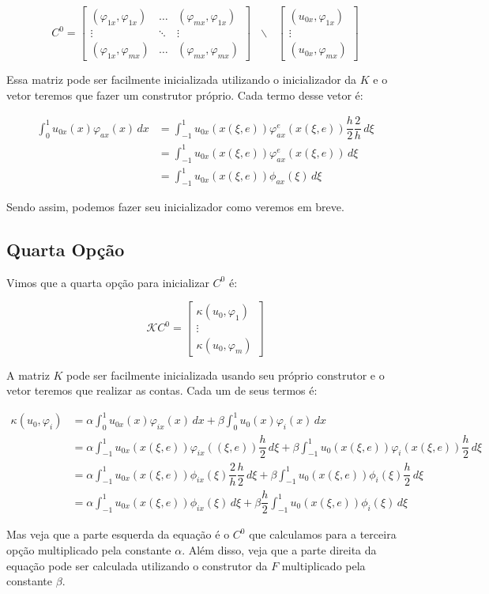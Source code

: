   \[C^0 = \begin{bmatrix}
            (\varphi_{1x}, \varphi_{1x}) & \dots & (\varphi_{mx}, \varphi_{1x}) \\
            \vdots & \ddots &\vdots \\
            (\varphi_{1x}, \varphi_{mx}) & \dots & (\varphi_{mx}, \varphi_{mx})
          \end{bmatrix}
          \text{ }\backslash\text{ }
          \begin{bmatrix}
            (u_{0x}, \varphi_{1x}) \\ \vdots \\ (u_{0x}, \varphi_{mx})
          \end{bmatrix}\]

  Essa matriz pode ser facilmente inicializada utilizando o inicializador da $K$ e o vetor teremos que fazer um construtor próprio. Cada termo desse vetor é:

  \begin{align*}
    \int_{0}^{1} u_{0x}(x) \varphi_{ax}(x)\,dx &= \int_{-1}^{1} u_{0x}(x(\xi, e)) \varphi^e_{ax}(x(\xi, e))\dfrac{h}{2}\dfrac{2}{h}\,d\xi\\
    &= \int_{-1}^{1} u_{0x}(x(\xi, e)) \varphi^e_{ax}(x(\xi, e))\,d\xi\\
    &= \int_{-1}^{1} u_{0x}(x(\xi, e)) \phi_{ax}(\xi)\,d\xi
  \end{align*}

  Sendo assim, podemos fazer seu inicializador como veremos em breve.

\subsection{Quarta Opção}

  Vimos que a quarta opção para inicializar $C^0$ é:

  \[\mathcal{K}C^0 = \begin{bmatrix} \kappa(u_0, \varphi_1) \\ \vdots \\ \kappa(u_0, \varphi_m) \end{bmatrix}\]

  A matriz $K$ pode ser facilmente inicializada usando seu próprio construtor e o vetor teremos que realizar as contas. Cada um de seus termos é:

  \begin{align*}
    \kappa(u_0, \varphi_i) &= \alpha \int_{0}^{1} u_{0x}(x) \varphi_{ix}(x)\,dx + \beta \int_{0}^{1} u_0(x) \varphi_i(x)\,dx\\
    &= \alpha \int_{-1}^{1} u_{0x}(x(\xi, e)) \varphi_{ix}((\xi, e))\dfrac{h}{2}\,d\xi + \beta \int_{-1}^{1} u_0(x(\xi, e)) \varphi_i(x(\xi, e))\dfrac{h}{2}\,d\xi \\
    &= \alpha \int_{-1}^{1} u_{0x}(x(\xi, e)) \phi_{ix}(\xi)\dfrac{2}{h}\dfrac{h}{2}\,d\xi + \beta \int_{-1}^{1} u_0(x(\xi, e)) \phi_i(\xi)\dfrac{h}{2}\,d\xi \\
    &= \alpha \int_{-1}^{1} u_{0x}(x(\xi, e)) \phi_{ix}(\xi)\,d\xi + \beta \dfrac{h}{2}\int_{-1}^{1} u_0(x(\xi, e)) \phi_i(\xi)\,d\xi
  \end{align*}

  Mas veja que a parte esquerda da equação é o $C^0$ que calculamos para a terceira opção multiplicado pela constante $\alpha$. Além disso, veja que a parte direita da equação pode ser calculada utilizando o construtor da $F$ multiplicado pela constante $\beta$.
